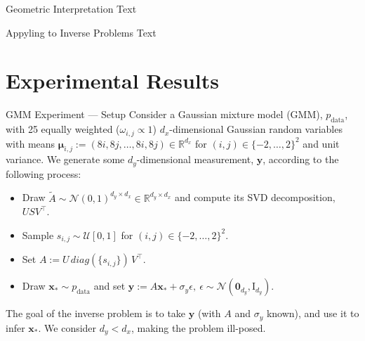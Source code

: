 \documentclass{beamer}
\begin{document}
    \begin{frame}{Geometric Interpretation}
        Text
    \end{frame}

    \begin{frame}{Appyling to Inverse Problems}
        Text
    \end{frame}

    \section{Experimental Results}

    \begin{frame}{GMM Experiment --- Setup}
        Consider a Gaussian mixture model (GMM), $p_{\text{data}}$, with 25 equally weighted
        ($\omega_{i,j} \propto 1$) $d_x$-dimensional Gaussian random variables with means
        $\mathbf{\mu}_{i,j} := (8i, 8j, \dots, 8i, 8j) \in \mathbb{R}^{d_x}$
        for $(i, j)\in \{-2, \ldots, 2\}^2$ and unit variance.
        We generate some $d_y$-dimensional measurement, $\mathbf{y}$, according to the following process:
        \begin{itemize}
            \item Draw $\tilde{A} \sim \mathcal{N}(0, 1)^{d_y \times d_x} \in \mathbb{R}^{d_y \times d_x}$
            and compute its SVD decomposition, $USV^\top$.
            \item Sample $s_{i,j} \sim \mathcal{U}[0,1]$ for $(i,j) \in \{-2, \dots, 2\}^2$.
            \item Set $A := U\, diag(\{s_{i,j}\})\, V^\top$.
            \item Draw $\mathbf{x}_* \sim p_{\text{data}}$ and set $\mathbf{y} := A\mathbf{x}_* + \sigma_y\epsilon,\ \epsilon \sim \mathcal{N}(\mathbf{0}_{d_y}, \mathrm{I}_{d_y})$.
        \end{itemize}
        
        The goal of the inverse problem is to take $\mathbf{y}$ (with $A$ and $\sigma_y$ known), and use
        it to infer $\mathbf{x}_*$. We consider $d_y < d_x$, making the problem ill-posed.
    \end{frame}
\end{document}
